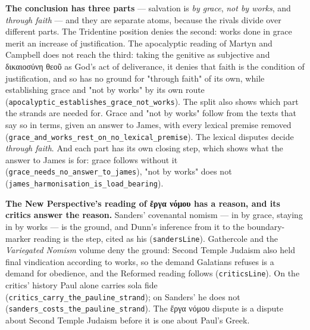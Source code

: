 \documentclass[11pt]{article}
\begin{document}
\textbf{The conclusion has three parts} — salvation is \emph{by grace}, \emph{not by works}, and \emph{through faith} — and they are separate atoms, because the rivals divide over different parts. The Tridentine position denies the second: works done in grace merit an increase of justification. The apocalyptic reading of Martyn and Campbell does not reach the third: taking the genitive as subjective and δικαιοσύνη θεοῦ as God's act of deliverance, it denies that faith is the condition of justification, and so has no ground for "through faith" of its own, while establishing grace and "not by works" by its own route (\texttt{apocalyptic\_\allowbreak{}establishes\_\allowbreak{}grace\_\allowbreak{}not\_\allowbreak{}works}). The split also shows which part the strands are needed for. Grace and "not by works" follow from the texts that say so in terms, given an answer to James, with every lexical premise removed (\texttt{grace\_\allowbreak{}and\_\allowbreak{}works\_\allowbreak{}rest\_\allowbreak{}on\_\allowbreak{}no\_\allowbreak{}lexical\_\allowbreak{}premise}). The lexical disputes decide \emph{through faith}. And each part has its own closing step, which shows what the answer to James is for: grace follows without it (\texttt{grace\_\allowbreak{}needs\_\allowbreak{}no\_\allowbreak{}answer\_\allowbreak{}to\_\allowbreak{}james}), "not by works" does not (\texttt{james\_\allowbreak{}harmonisation\_\allowbreak{}is\_\allowbreak{}load\_\allowbreak{}bearing}).

\textbf{The New Perspective's reading of ἔργα νόμου has a reason, and its critics answer the reason.} Sanders' covenantal nomism — in by grace, staying in by works — is the ground, and Dunn's inference from it to the boundary-marker reading is the step, cited as his (\texttt{sanders\allowbreak{}Line}). Gathercole and the \emph{Variegated Nomism} volume deny the ground: Second Temple Judaism also held final vindication according to works, so the demand Galatians refuses is a demand for obedience, and the Reformed reading follows (\texttt{critics\allowbreak{}Line}). On the critics' history Paul alone carries sola fide (\texttt{critics\_\allowbreak{}carry\_\allowbreak{}the\_\allowbreak{}pauline\_\allowbreak{}strand}); on Sanders' he does not (\texttt{sanders\_\allowbreak{}costs\_\allowbreak{}the\_\allowbreak{}pauline\_\allowbreak{}strand}). The ἔργα νόμου dispute is a dispute about Second Temple Judaism before it is one about Paul's Greek.
\end{document}
